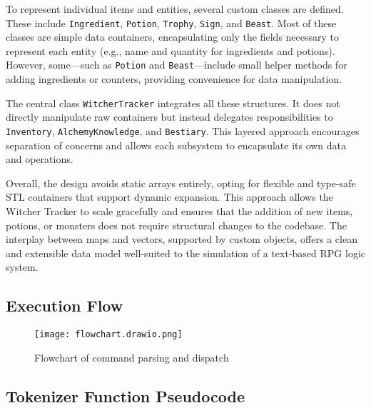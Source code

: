 \documentclass{article}
\begin{document}
To represent individual items and entities, several custom classes are defined. These include \texttt{Ingredient}, \texttt{Potion}, \texttt{Trophy}, \texttt{Sign}, and \texttt{Beast}. Most of these classes are simple data containers, encapsulating only the fields necessary to represent each entity (e.g., name and quantity for ingredients and potions). However, some—such as \texttt{Potion} and \texttt{Beast}—include small helper methods for adding ingredients or counters, providing convenience for data manipulation.

The central class \texttt{WitcherTracker} integrates all these structures. It does not directly manipulate raw containers but instead delegates responsibilities to \texttt{Inventory}, \texttt{AlchemyKnowledge}, and \texttt{Bestiary}. This layered approach encourages separation of concerns and allows each subsystem to encapsulate its own data and operations.

Overall, the design avoids static arrays entirely, opting for flexible and type-safe STL containers that support dynamic expansion. This approach allows the Witcher Tracker to scale gracefully and ensures that the addition of new items, potions, or monsters does not require structural changes to the codebase. The interplay between maps and vectors, supported by custom objects, offers a clean and extensible data model well-suited to the simulation of a text-based RPG logic system.

\newpage

\subsection*{Execution Flow}

\begin{figure}[h!]
    \centering
    \texttt{[image: flowchart.drawio.png]}
    \caption{Flowchart of command parsing and dispatch}
    \label{fig:flowchart}
\end{figure}

\subsection*{Tokenizer Function Pseudocode}
\end{document}
